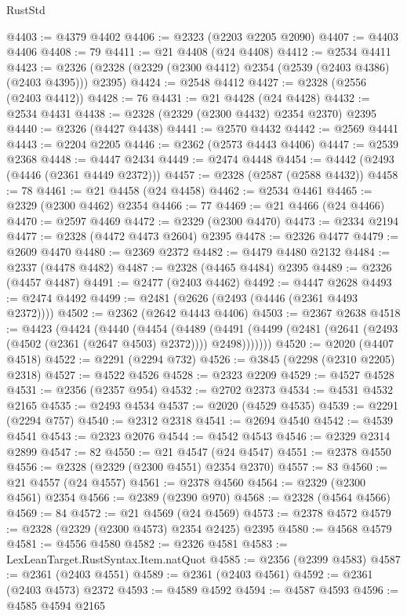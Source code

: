 \begin{lexlean}{RustStd}
\begin{coremodule}
{\begin{coremodule}
{{{{{{{{{{{{{{{{{{{{{{{{{{{{{{{{{{{{{@4403 := @4379 @4402
@4406 := @2323 (@2203 @2205 @2090)
@4407 := @4403 @4406
@4408 := 79
@4411 := @21 @4408 (@24 @4408)
@4412 := @2534 @4411
@4423 := @2326 (@2328 (@2329 (@2300 @4412) @2354 (@2539 (@2403 @4386) (@2403 @4395))) @2395)
@4424 := @2548 @4412
@4427 := @2328 (@2556 (@2403 @4412))
@4428 := 76
@4431 := @21 @4428 (@24 @4428)
@4432 := @2534 @4431
@4438 := @2328 (@2329 (@2300 @4432) @2354 @2370) @2395
@4440 := @2326 (@4427 @4438)
@4441 := @2570 @4432
@4442 := @2569 @4441
@4443 := @2204 @2205
@4446 := @2362 (@2573 @4443 @4406)
@4447 := @2539 @2368
@4448 := @4447 @2434
@4449 := @2474 @4448
@4454 := @4442 (@2493 (@4446 (@2361 @4449 @2372)))
@4457 := @2328 (@2587 (@2588 @4432))
@4458 := 78
@4461 := @21 @4458 (@24 @4458)
@4462 := @2534 @4461
@4465 := @2329 (@2300 @4462) @2354
@4466 := 77
@4469 := @21 @4466 (@24 @4466)
@4470 := @2597 @4469
@4472 := @2329 (@2300 @4470)
@4473 := @2334 @2194
@4477 := @2328 (@4472 @4473 @2604) @2395
@4478 := @2326 @4477
@4479 := @2609 @4470
@4480 := @2369 @2372
@4482 := @4479 @4480 @2132
@4484 := @2337 (@4478 @4482)
@4487 := @2328 (@4465 @4484) @2395
@4489 := @2326 (@4457 @4487)
@4491 := @2477 (@2403 @4462)
@4492 := @4447 @2628
@4493 := @2474 @4492
@4499 := @2481 (@2626 (@2493 (@4446 (@2361 @4493 @2372))))
@4502 := @2362 (@2642 @4443 @4406)
@4503 := @2367 @2638
@4518 := @4423
    (@4424
      (@4440
        (@4454
          (@4489
            (@4491 (@4499 (@2481 (@2641 (@2493 (@4502 (@2361 (@2647 @4503) @2372)))) @2498)))))))
@4520 := @2020 (@4407 @4518)
@4522 := @2291 (@2294 @732)
@4526 := @3845 (@2298 (@2310 @2205) @2318)
@4527 := @4522 @4526
@4528 := @2323 @2209
@4529 := @4527 @4528
@4531 := @2356 (@2357 @954)
@4532 := @2702 @2373
@4534 := @4531 @4532 @2165
@4535 := @2493 @4534
@4537 := @2020 (@4529 @4535)
@4539 := @2291 (@2294 @757)
@4540 := @2312 @2318
@4541 := @2694 @4540
@4542 := @4539 @4541
@4543 := @2323 @2076
@4544 := @4542 @4543
@4546 := @2329 @2314 @2899
@4547 := 82
@4550 := @21 @4547 (@24 @4547)
@4551 := @2378 @4550
@4556 := @2328 (@2329 (@2300 @4551) @2354 @2370)
@4557 := 83
@4560 := @21 @4557 (@24 @4557)
@4561 := @2378 @4560
@4564 := @2329 (@2300 @4561) @2354
@4566 := @2389 (@2390 @970)
@4568 := @2328 (@4564 @4566)
@4569 := 84
@4572 := @21 @4569 (@24 @4569)
@4573 := @2378 @4572
@4579 := @2328 (@2329 (@2300 @4573) @2354 @2425) @2395
@4580 := @4568 @4579
@4581 := @4556 @4580
@4582 := @2326 @4581
@4583 := LexLeanTarget.RustSyntax.Item.natQuot
@4585 := @2356 (@2399 @4583)
@4587 := @2361 (@2403 @4551)
@4589 := @2361 (@2403 @4561)
@4592 := @2361 (@2403 @4573) @2372
@4593 := @4589 @4592
@4594 := @4587 @4593
@4596 := @4585 @4594 @2165
}}}}}}}}}}}}}}}}}}}}}}}}}}}}}}}}}}}}}
\end{coremodule}}
\end{coremodule}
\end{lexlean}
